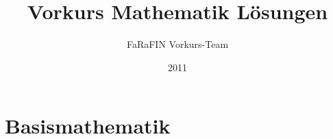 \documentclass[fontsize=9pt,paper=a5,fleqn,parskip=full-,DIV15, openany]{scrbook}
\begin{document}
\title{Vorkurs Mathematik L\"osungen}
\author{FaRaFIN Vorkurs-Team}
\date{2011}
\maketitle

\tableofcontents

\addtocounter{chapter}{1}
\chapter{Basismathematik}











%
\end{document}

